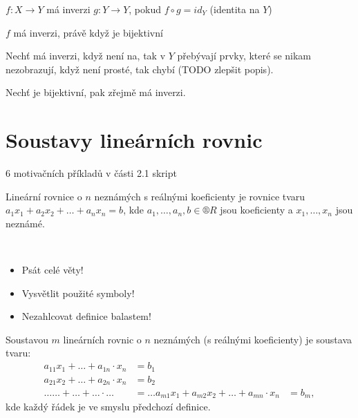 \documentclass[12pt]{article}					%
\begin{document}
        \begin{definice}[Inverze]
            $f: X \longrightarrow Y$ má inverzi $g: Y \longrightarrow Y$, pokud $ f \circ g = id_Y$ (identita na $Y$)
        \end{definice}

        \begin{veta}
            $f$ má inverzi, právě když je bijektivní
            \begin{dukazin}
                Nechť má inverzi, když není na, tak v $Y$ přebývají prvky, které se nikam nezobrazují, když není prosté, tak chybí (TODO zlepšit popis).

                Nechť je bijektivní, pak zřejmě má inverzi.
            \end{dukazin}
        \end{veta}


        
\section{Soustavy lineárních rovnic}
    6 motivačních příkladů v části 2.1 skript

    \begin{definice}
        Lineární rovnice o $n$ neznámých s reálnými koeficienty je rovnice tvaru $a_1 x_1 + a_2 x_2 + … + a_n x_n = b$, kde $a_1, …, a_n, b \in ®R$ jsou koeficienty a $x_1, …, x_n$ jsou neznámé.
    \end{definice}

    \begin{upozorneni}
        \ 
        \begin{itemize}
            \item Psát celé věty!
            \item Vysvětlit použité symboly!
            \item Nezahlcovat definice balastem!
        \end{itemize}
    \end{upozorneni}

    \begin{definice}
        Soustavou $m$ lineárních rovnic o $n$ neznámých (s reálnými koeficienty) je soustava tvaru:
        \begin{align*}
                a_{11} x_1 + … + a_{1n} \cdot x_n &= b_1\\
                a_{21} x_2 + … + a_{2n} \cdot x_n &= b_2\\
                … … + … + …\cdot … &= …
                a_{m1} x_1 + a_{m2} x_2 + … + a_{mn} \cdot x_n &= b_m, 
        \end{align*}
        kde každý řádek je ve smyslu předchozí definice.
    \end{definice}
\end{document}
